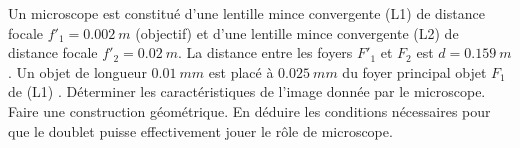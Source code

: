 %
\begin{exercice}[Microscope]
Un microscope est constitué d'une lentille mince convergente (L1) de distance focale $f'_1 = \SI{0,002}{m}$ (objectif) et d'une lentille mince convergente (L2) de distance focale $f'_2 = \SI{0,02}{m}$. La distance entre les foyers $F'_1$ et $F_2$ est $d = \SI{0,159}{m}$. Un objet de longueur $\SI{0,01}{mm}$ est placé à $\SI{0,025}{mm}$ du foyer principal objet $F_1$ de (L1) . Déterminer les caractéristiques de l'image donnée par le microscope. Faire une construction géométrique. En déduire les conditions nécessaires pour que le doublet puisse effectivement jouer le rôle de microscope.
\end{exercice}

